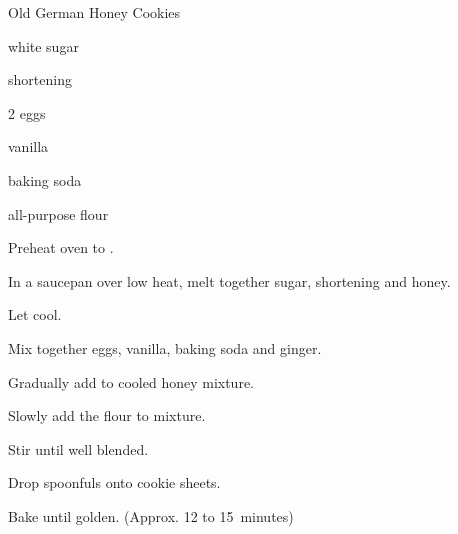 \begin{recipe}{Old German Honey Cookies}{}{}

\begin{ingredients}
\item {} white sugar
\item {} shortening
\item {} 
\item 2 eggs
\item {} vanilla
\item {} baking soda
\item {} all-purpose flour
\item {} 
\end{ingredients}

\begin{directions}
\item Preheat oven to .
\item In a saucepan over low heat, melt together sugar, shortening and honey. 
\item Let cool.
\item Mix together eggs, vanilla, baking soda and ginger.
\item Gradually add to cooled honey mixture.
\item Slowly add the flour to mixture.
\item Stir until well blended.
\item Drop spoonfuls onto cookie sheets.
\item Bake until golden. (Approx. 12 to 15~minutes)
\end{directions}
\end{recipe}
